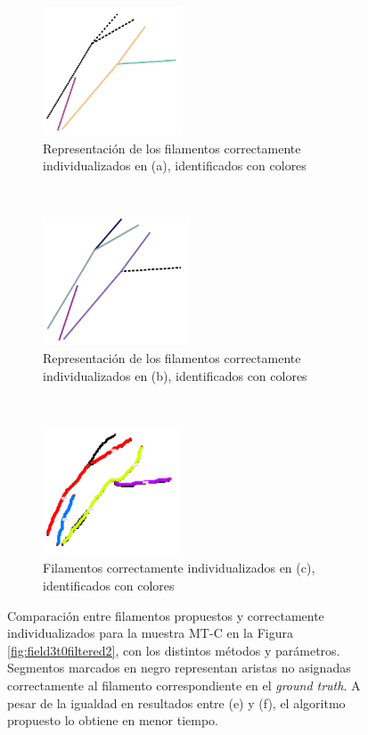 \begin{figure}[h!]
    \begin{subfigure}[t]{0.3\textwidth}
        \centering
        \includegraphics[height=1.5in]{resultImages/field3-t0-2cellBcrop-filtered-2-DeFiNeExactMatch-30.png}
        \caption{Representaci\'on de los filamentos correctamente individualizados en (a), identificados con colores}
        \label{fig:field3t0filtered2Results-d}
    \end{subfigure}%
    ~ 
    \begin{subfigure}[t]{0.3\textwidth}
        \centering
        \includegraphics[height=1.5in]{resultImages/field3-t0-2cellBcrop-filtered-2-DeFiNeExactMatch-60.png}
        \caption{Representaci\'on de los filamentos correctamente individualizados en (b), identificados con colores}
        \label{fig:field3t0filtered2Results-e}
    \end{subfigure}
    ~ 
    \begin{subfigure}[t]{0.3\textwidth}
        \centering
        \includegraphics[height=1.5in]{resultImages/field3-t0-2cellBcrop-filtered-2-phil-s1271-v05-exactMatch-antLabeled.png}
        \caption{Filamentos correctamente individualizados en (c), identificados con colores}
        \label{fig:field3t0filtered2Results-f}
    \end{subfigure}
    
    \caption[Comparaci\'on entre filamentos propuestos y correctamente individualizados para la muestra MT-C en la Figura \ref{fig:field3t0filtered2}, con los distintos m\'etodos y par\'ametros.]{Comparaci\'on entre filamentos propuestos y correctamente individualizados para la muestra MT-C en la Figura \ref{fig:field3t0filtered2}, con los distintos m\'etodos y par\'ametros. Segmentos marcados en negro representan aristas no asignadas correctamente al filamento correspondiente en el {\it ground truth}. A pesar de la igualdad en resultados entre (e) y (f), el algoritmo propuesto lo obtiene en menor tiempo.}
    \label{fig:field3t0filtered2Results}
\end{figure}

